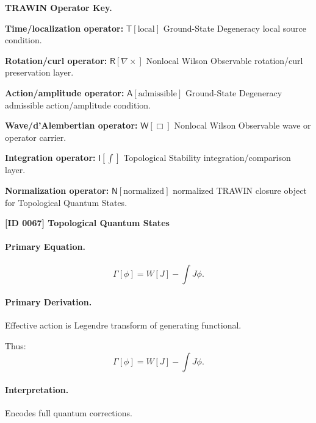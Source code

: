 \par\vspace{0.45\baselineskip}
\noindent\begin{minipage}[t]{\linewidth}
\begingroup
\small
\raggedright
\textbf{TRAWIN Operator Key.}\par
\noindent\textbf{Time/localization operator:} $\mathsf{T}\!\left[\mathrm{local}\right]$ Ground-State Degeneracy local source condition.\par
\noindent\textbf{Rotation/curl operator:} $\mathsf{R}\!\left[\nabla\times\right]$ Nonlocal Wilson Observable rotation/curl preservation layer.\par
\noindent\textbf{Action/amplitude operator:} $\mathsf{A}\!\left[\mathrm{admissible}\right]$ Ground-State Degeneracy admissible action/amplitude condition.\par
\noindent\textbf{Wave/d'Alembertian operator:} $\mathsf{W}\!\left[\Box\right]$ Nonlocal Wilson Observable wave or operator carrier.\par
\noindent\textbf{Integration operator:} $\mathsf{I}\!\left[\int\right]$ Topological Stability integration/comparison layer.\par
\noindent\textbf{Normalization operator:} $\mathsf{N}\!\left[\mathrm{normalized}\right]$ normalized TRAWIN closure object for Topological Quantum States.\par
\endgroup
\end{minipage}

\clearpage
\noindent\textbf{[ID 0067] Topological Quantum States}\par
\vspace{0.35em}
\paragraph{Primary Equation.}
\begin{equation}
\Gamma[\phi] = W[J] - \int J\phi.
\end{equation}

\paragraph{Primary Derivation.}
Effective action is Legendre transform of generating functional.

Thus:
\begin{equation}
\boxed{
\Gamma[\phi] = W[J] - \int J\phi.
}
\end{equation}

\paragraph{Interpretation.}
Encodes full quantum corrections.

